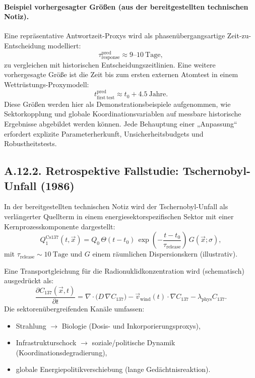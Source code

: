 \documentclass[13pt,a4paper]{article}
\begin{document}
	\paragraph{Beispiel vorhergesagter Größen (aus der bereitgestellten technischen Notiz).}
	Eine repräsentative Antwortzeit-Proxys wird als phasenübergangsartige Zeit-zu-Entscheidung modelliert:
	$$ \tau_{\mathrm{response}}^{\mathrm{pred}}\approx 9\text{--}10\ \mathrm{Tage}, $$
	zu vergleichen mit historischen Entscheidungszeitlinien. Eine weitere vorhergesagte Größe ist die Zeit bis zum ersten externen Atomtest in einem Wettrüstungs-Proxymodell:
	$$ t_{\mathrm{first\ test}}^{\mathrm{pred}} \approx t_0 + 4.5\ \mathrm{Jahre}. $$
	Diese Größen werden hier als Demonstrationsbeispiele aufgenommen, wie Sektorkopplung und globale Koordinationsvariablen auf messbare historische Ergebnisse abgebildet werden können. Jede Behauptung einer „Anpassung“ erfordert explizite Parameterherkunft, Unsicherheitsbudgets und Robustheitstests.
	
	\subsection*{A.12.2. Retrospektive Fallstudie: Tschernobyl-Unfall (1986)}
	
	In der bereitgestellten technischen Notiz wird der Tschernobyl-Unfall als verlängerter Quellterm in einem energiesektorspezifischen Sektor mit einer Kernprozesskomponente dargestellt:
	$$ Q_{1}^{\mathrm{Cs137}}(t,\vec{x}) = Q_0\,\Theta(t-t_0)\,\exp\!\left(-\frac{t-t_0}{\tau_{\mathrm{release}}}\right)\,G(\vec{x};\sigma), $$
	mit $\tau_{\mathrm{release}}\sim 10\ \mathrm{Tage}$ und $G$ einem räumlichen Dispersionskern (illustrativ).
	
	Eine Transportgleichung für die Radionuklidkonzentration wird (schematisch) ausgedrückt als:
	$$ \frac{\partial C_{137}(\vec{x},t)}{\partial t}
	= \nabla\cdot\big(D\,\nabla C_{137}\big) - \vec{v}_{\mathrm{wind}}(t)\cdot\nabla C_{137} - \lambda_{\mathrm{phys}} C_{137}. $$
	Die sektorenübergreifenden Kanäle umfassen:
	\begin{itemize}[leftmargin=*]
		\item Strahlung $\to$ Biologie (Dosis- und Inkorporierungsproxys),
		\item Infrastrukturschock $\to$ soziale/politische Dynamik (Koordinationsdegradierung),
		\item globale Energiepolitikverschiebung (lange Gedächtnisreaktion).
	\end{itemize}
	
\end{document}
